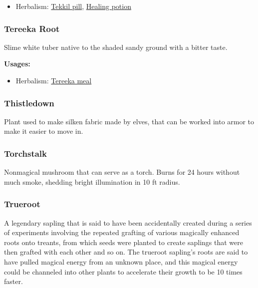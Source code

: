 \begin{itemize}[noitemsep]
\item[] Herbalism: \hyperref[Tekkil pill]{Tekkil pill}, \hyperref[healing_potion]{Healing potion}
\end{itemize}

\subsubsection{Tereeka Root}
\label{Tereeka Root}

Slime white tuber native to the shaded sandy ground with a bitter taste.

\vspace{5mm}

\textbf{Usages:}

\begin{itemize}[noitemsep]
\item[] Herbalism: \hyperref[Tereeka meal]{Tereeka meal}
\end{itemize}

\subsubsection{Thistledown}

Plant used to make silken fabric made by elves, that can be worked into armor to make it easier to move in.

\subsubsection{Torchstalk}

Nonmagical mushroom that can serve as a torch. Burns for 24 hours without much smoke, shedding bright illumination in 10 ft radius.

\subsubsection{Trueroot}

A legendary sapling that is said to have been accidentally created during a series of experiments involving the repeated grafting of various magically enhanced roots onto treants, from which seeds were planted to create saplings that were then grafted with each other and so on. The trueroot sapling's roots are said to have pulled magical energy from an unknown place, and this magical energy could be channeled into other plants to accelerate their growth to be 10 times faster.

